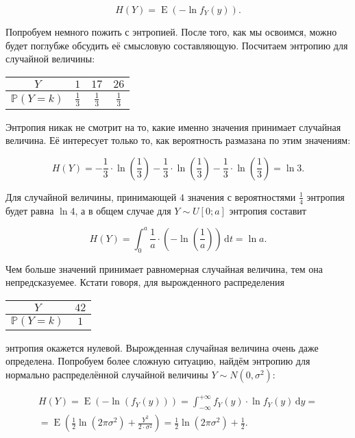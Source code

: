 \documentclass[12pt, a4paper, oneside]{extreport}
\DeclareMathOperator{\E}{\mathop{E}}
\def \mbb{\mathbb}
\def \PP{\mbb{P}}
\newcommand{\dx}[1]{\,\mathrm{d}#1} %
\theoremstyle{plain}              %
\theoremstyle{definition}         %
\begin{document}
\[ H(Y) = \E(- \ln f_Y(y)). \]

Попробуем немного пожить с энтропией. После того, как мы освоимся, можно будет поглубже обсудить её смысловую составляющую. Посчитаем энтропию для случайной величины:

\begin{center}
	\begin{tabular}{c|c|c|c}
		$Y$ & $1$ & $17$  &  $26$  \\ \hline
		$\PP(Y = k)$ & $\frac{1}{3}$ & $\frac{1}{3}$  & $\frac{1}{3}$ 
	\end{tabular}
\end{center}

Энтропия никак не смотрит на то, какие именно значения принимает случайная величина. Её интересует только то, как вероятность размазана по этим значениям:

\[ H(Y) = - \frac{1}{3} \cdot \ln \left(\frac{1}{3}\right)- \frac{1}{3} \cdot \ln \left(\frac{1}{3}\right) - \frac{1}{3} \cdot \ln \left(\frac{1}{3}\right) = \ln 3.\] 

Для случайной величины, принимающей $4$ значения с вероятностями $\frac{1}{4}$ энтропия будет равна $\ln 4$, а в общем случае для $Y \sim U[0;a]$ энтропия составит 

\[H(Y) = \int_0^a \frac{1}{a} \cdot (- \ln\left(\frac{1}{a}\right)) \dx{t} = \ln a. \]

Чем больше значений принимает равномерная случайная величина, тем она непредсказуемее.  Кстати говоря, для вырожденного распределения 

\begin{center}
	\begin{tabular}{c|c}
		$Y$ & $42$   \\ \hline
		$\PP(Y = k)$ & $1$
	\end{tabular}
\end{center}

энтропия окажется нулевой. Вырожденная случайная величина очень даже определена. Попробуем более сложную ситуацию, найдём энтропию для нормально распределённой случайной величины $Y \sim N(0, \sigma^2)$:

\begin{multline*}
H(Y) = \E( - \ln(f_Y(y)))  = \int_{-\infty}^{+\infty} f_Y(y) \cdot \ln f_Y(y) \dx{y} = \\ = \E\left(\frac{1}{2} \ln(2 \pi \sigma^2 ) + \frac{Y^2}{2\cdot \sigma^2}\right) = \frac{1}{2} \ln(2 \pi \sigma^2) + \frac{1}{2}.
\end{multline*} 
\end{document}
